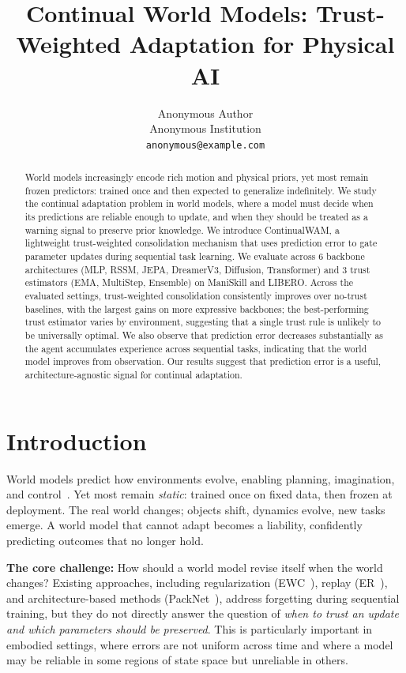\documentclass{article}
\title{Continual World Models: Trust-Weighted Adaptation for Physical AI}
\author{
  Anonymous Author\\
  Anonymous Institution\\
  \texttt{anonymous@example.com}
}
\begin{document}
\maketitle

\begin{abstract}
World models increasingly encode rich motion and physical priors, yet most remain frozen predictors: trained once and then expected to generalize indefinitely. We study the continual adaptation problem in world models, where a model must decide when its predictions are reliable enough to update, and when they should be treated as a warning signal to preserve prior knowledge. We introduce ContinualWAM, a lightweight trust-weighted consolidation mechanism that uses prediction error to gate parameter updates during sequential task learning. We evaluate across 6 backbone architectures (MLP, RSSM, JEPA, DreamerV3, Diffusion, Transformer) and 3 trust estimators (EMA, MultiStep, Ensemble) on ManiSkill and LIBERO. Across the evaluated settings, trust-weighted consolidation consistently improves over no-trust baselines, with the largest gains on more expressive backbones; the best-performing trust estimator varies by environment, suggesting that a single trust rule is unlikely to be universally optimal. We also observe that prediction error decreases substantially as the agent accumulates experience across sequential tasks, indicating that the world model improves from observation. Our results suggest that prediction error is a useful, architecture-agnostic signal for continual adaptation.
\end{abstract}

\section{Introduction}

World models predict how environments evolve, enabling planning, imagination, and control~\cite{hafner2025dreamerv3}. Yet most remain \emph{static}: trained once on fixed data, then frozen at deployment. The real world changes; objects shift, dynamics evolve, new tasks emerge. A world model that cannot adapt becomes a liability, confidently predicting outcomes that no longer hold.

\textbf{The core challenge:} How should a world model revise itself when the world changes? Existing approaches, including regularization (EWC~\cite{kirkpatrick2017overcoming}), replay (ER~\cite{rebuffi2017icarl}), and architecture-based methods (PackNet~\cite{mallya2018packnet}), address forgetting during sequential training, but they do not directly answer the question of \emph{when to trust an update and which parameters should be preserved}. This is particularly important in embodied settings, where errors are not uniform across time and where a model may be reliable in some regions of state space but unreliable in others.
\end{document}
